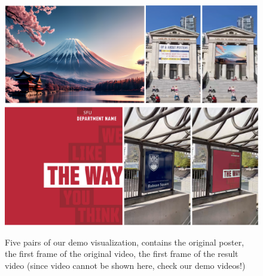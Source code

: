 \documentclass[sigconf]{acmart}
\begin{document}
\begin{figure}[t]
  \centering
  \includegraphics[width=\linewidth]{fig/figure6.png}
  \includegraphics[width=\linewidth]{fig/figure7.png}
  \caption{Five pairs of our demo visualization, contains the original poster, the first frame of the original video, the first frame of the result video (since video cannot be shown here, check our demo videos!)}
  \label{fig:pipeline}
   \vspace{-0.2cm}
\end{figure}
\end{document}
